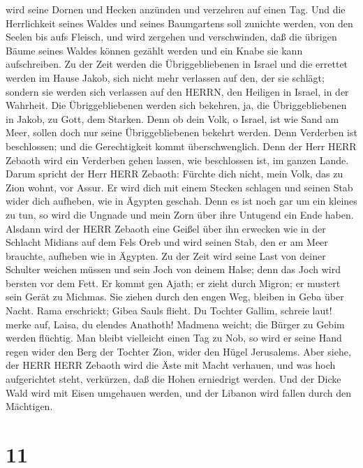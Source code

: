 wird seine Dornen und Hecken anzünden und verzehren auf einen Tag.
 Und die Herrlichkeit seines Waldes und seines Baumgartens
soll zunichte werden, von den Seelen bis aufs Fleisch, und wird zergehen
und verschwinden,  daß die übrigen Bäume seines Waldes
können gezählt werden und ein Knabe sie kann aufschreiben. 
Zu der Zeit werden die Übriggebliebenen in Israel und die errettet
werden im Hause Jakob, sich nicht mehr verlassen auf den, der sie
schlägt; sondern sie werden sich verlassen auf den HERRN, den Heiligen
in Israel, in der Wahrheit.  Die Übriggebliebenen werden
sich bekehren, ja, die Übriggebliebenen in Jakob, zu Gott, dem Starken.
 Denn ob dein Volk, o Israel, ist wie Sand am Meer, sollen
doch nur seine Übriggebliebenen bekehrt werden. Denn Verderben ist
beschlossen; und die Gerechtigkeit kommt überschwenglich. 
Denn der Herr HERR Zebaoth wird ein Verderben gehen lassen, wie
beschlossen ist, im ganzen Lande.  Darum spricht der Herr
HERR Zebaoth: Fürchte dich nicht, mein Volk, das zu Zion wohnt, vor
Assur. Er wird dich mit einem Stecken schlagen und seinen Stab wider
dich aufheben, wie in Ägypten geschah.  Denn es ist noch
gar um ein kleines zu tun, so wird die Ungnade und mein Zorn über ihre
Untugend ein Ende haben.  Alsdann wird der HERR Zebaoth
eine Geißel über ihn erwecken wie in der Schlacht Midians auf dem Fels
Oreb und wird seinen Stab, den er am Meer brauchte, aufheben wie in
Ägypten.  Zu der Zeit wird seine Last von deiner Schulter
weichen müssen und sein Joch von deinem Halse; denn das Joch wird
bersten vor dem Fett.  Er kommt gen Ajath; er zieht durch
Migron; er mustert sein Gerät zu Michmas.  Sie ziehen durch
den engen Weg, bleiben in Geba über Nacht. Rama erschrickt; Gibea Sauls
flieht.  Du Tochter Gallim, schreie laut! merke auf, Laisa,
du elendes Anathoth!  Madmena weicht; die Bürger zu Gebim
werden flüchtig.  Man bleibt vielleicht einen Tag zu Nob,
so wird er seine Hand regen wider den Berg der Tochter Zion, wider den
Hügel Jerusalems.  Aber siehe, der HERR HERR Zebaoth wird
die Äste mit Macht verhauen, und was hoch aufgerichtet steht, verkürzen,
daß die Hohen erniedrigt werden.  Und der Dicke Wald wird
mit Eisen umgehauen werden, und der Libanon wird fallen durch den
Mächtigen.

\hypertarget{section-10}{%
\section{11}\label{section-10}}

